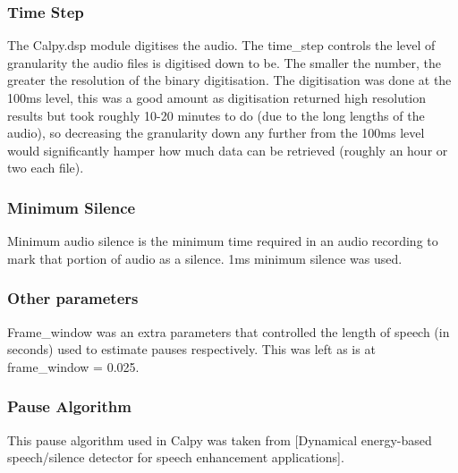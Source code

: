 \subsubsection{Time Step}
The Calpy.dsp module digitises the audio. The time\_step controls the level of granularity the audio files is digitised down to be. The smaller the number, the greater the resolution of the binary digitisation. The digitisation was done at the 100ms level, this was a good amount as digitisation returned high resolution results but took roughly 10-20 minutes to do (due to the long lengths of the audio), so decreasing the granularity down any further from the 100ms level would significantly hamper how much data can be retrieved (roughly an hour or two each file). 

\subsubsection{Minimum Silence}
Minimum audio silence is the minimum time required in an audio recording to mark that portion of audio as a silence. 1ms minimum silence was used. 

\subsubsection{Other parameters}
Frame\_window was an extra parameters that controlled the length of speech (in seconds) used to estimate pauses respectively. This was left as is at frame\_window = 0.025. 

\subsubsection{Pause Algorithm} 
This pause algorithm used in Calpy was taken from [Dynamical energy-based speech/silence detector for speech enhancement applications].

